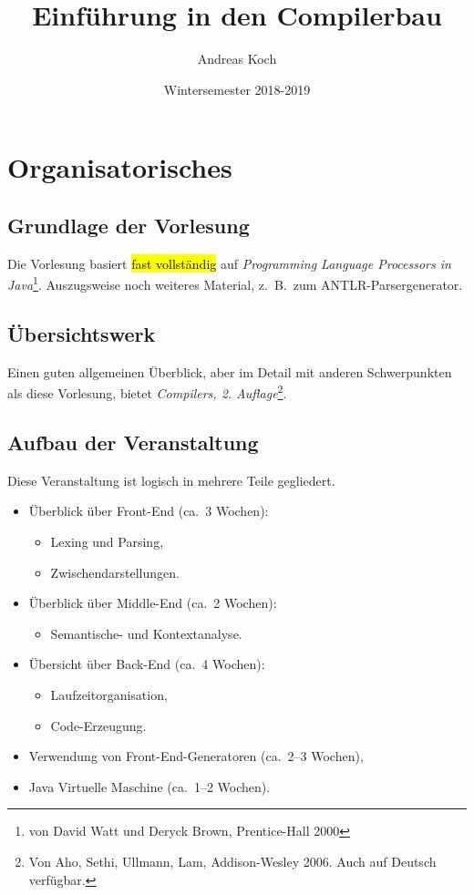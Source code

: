\documentclass{scrartcl}
\title{Einführung in den Compilerbau}
\date{Wintersemester 2018-2019}
\author{Andreas Koch}
\begin{document}
  \maketitle
  \tableofcontents
  \newpage
  
  
  \section{Organisatorisches}
   
  \subsection{Grundlage der Vorlesung}
   
  Die Vorlesung basiert \hl{fast vollständig} auf \emph{Programming Language Processors in Java}\footnote{von David Watt und Deryck Brown, Prentice-Hall 2000}. Auszugsweise noch weiteres Material, z.\ B.\ zum ANTLR-Parsergenerator.
  
  \subsection{Übersichtswerk}
  
  Einen guten allgemeinen Überblick, aber im Detail mit anderen Schwerpunkten als diese Vorlesung, bietet \emph{Compilers, 2. Auflage}\footnote{Von Aho, Sethi, Ullmann, Lam, Addison-Wesley 2006. Auch auf Deutsch verfügbar.}.
   
  \subsection{Aufbau der Veranstaltung}
  
  Diese Veranstaltung ist logisch in mehrere Teile gegliedert.
  
  \begin{itemize}
    \item Überblick über Front-End (ca.\ 3 Wochen):
    \begin{itemize}
      \item Lexing und Parsing,
      \item Zwischendarstellungen.
    \end{itemize}
    \item Überblick über Middle-End (ca.\ 2 Wochen):
    \begin{itemize}
      \item Semantische- und Kontextanalyse.
    \end{itemize}
    \item Übersicht über Back-End (ca.\ 4 Wochen):
    \begin{itemize}
      \item Laufzeitorganisation,
      \item Code-Erzeugung.
    \end{itemize}
    \item Verwendung von Front-End-Generatoren (ca.\ 2--3 Wochen),
    \item Java Virtuelle Maschine (ca.\ 1--2 Wochen).
  \end{itemize}
\end{document}
